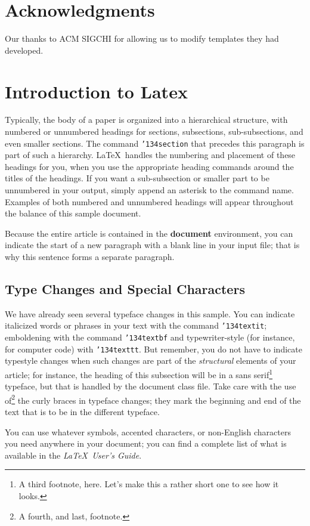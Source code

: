\documentclass{sig-alternate-br}
\begin{document}
\section{Acknowledgments}
Our thanks to ACM SIGCHI for allowing us to modify templates they had developed.

\section{Introduction to Latex}
Typically, the body of a paper is organized into a hierarchical
structure, with numbered or unnumbered headings for sections,
subsections, sub-subsections, and even smaller sections.  The
command \texttt{{\char'134}section} that precedes this paragraph
is part of such a hierarchy. \LaTeX\ handles the numbering and placement of these
headings for you, when you use the appropriate heading commands
around the titles of the headings.  If you want a sub-subsection
or smaller part to be unnumbered in your output, simply append an
asterisk to the command name.  Examples of both numbered and
unnumbered headings will appear throughout the balance of this
sample document.

Because the entire article is contained in the \textbf{document}
environment, you can indicate the start of a new paragraph with a
blank line in your input file; that is why this sentence forms a
separate paragraph.

\subsection{Type Changes and {\subsecit Special} Characters}
We have already seen several typeface changes in this sample.  You
can indicate italicized words or phrases in your text with the
command \texttt{{\char'134}textit}; emboldening with the command
\texttt{{\char'134}textbf} and typewriter-style (for instance, for
computer code) with \texttt{{\char'134}texttt}.  But remember, you
do not have to indicate typestyle changes when such changes are
part of the \textit{structural} elements of your article; for
instance, the heading of this subsection will be in a sans
serif\footnote{A third footnote, here. Let's make this a rather
short one to see how it looks.} typeface, but that is handled by
the document class file. Take care with the use of\footnote{A
fourth, and last, footnote.} the curly braces in typeface changes;
they mark the beginning and end of the text that is to be in the
different typeface.

You can use whatever symbols, accented characters, or non-English
characters you need anywhere in your document; you can find a
complete list of what is available in the \textit{\LaTeX\ User's
Guide}\cite{Lamport:LaTeX}.
\end{document}
